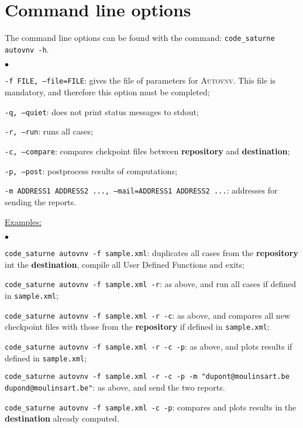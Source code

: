 \documentclass[a4paper,10pt,twoside]{article}
\begin{document}
\section{Command line options}

The command line options can be found with the command: \texttt{code\_saturne autovnv -h}.

\begin{list}{$\bullet$}{}
\item \texttt{-f FILE, --file=FILE}: gives the file of parameters for \textsc{Autovnv}.
This file is mandatory, and therefore this option must be completed;
\item \texttt{-q, --quiet}: does not print status messages to stdout;
\item \texttt{-r, --run}: runs all cases;
\item \texttt{-c, --compare}: compares chekpoint files between \textbf{repository} and \textbf{destination};
\item \texttt{-p, --post}: postprocess results of computations;
\item \texttt{-m ADDRESS1 ADDRESS2 ..., --mail=ADDRESS1 ADDRESS2 ...}: addresses for sending the reports.
\end{list}

\underline{Examples:}

\begin{list}{$\bullet$}{}
\item \texttt{code\_saturne autovnv -f sample.xml}: duplicates all cases from the \textbf{repository}
int the \textbf{destination}, compile all User Defined Functions and exits;
\item \texttt{code\_saturne autovnv -f sample.xml -r}: as above, and run all cases if defined
in \texttt{sample.xml};
\item \texttt{code\_saturne autovnv -f sample.xml -r -c}: as above, and compares all new checkpoint files
with those from the \textbf{repository} if defined in \texttt{sample.xml};
\item \texttt{code\_saturne autovnv -f sample.xml -r -c -p}: as above, and plots results
if defined in \texttt{sample.xml};
\item \texttt{code\_saturne autovnv -f sample.xml -r -c -p -m "dupont@moulinsart.be dupond@moulinsart.be"}: as above,
and send the two reports.
\item \texttt{code\_saturne autovnv -f sample.xml -c -p}: compares and plots results in the \textbf{destination}
already computed.
\end{list}
\end{document}
